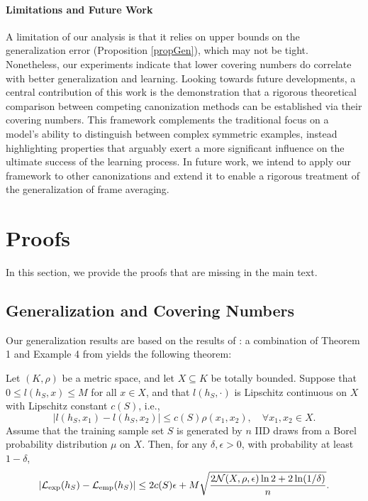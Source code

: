 \documentclass{article}
\begin{document}
\paragraph{Limitations and Future Work}
A limitation of our analysis is that it relies on upper bounds on the generalization error (Proposition \ref{propGen}), which may not be tight. Nonetheless, our experiments indicate that lower covering numbers do correlate with better generalization and learning. Looking towards future developments, a central contribution of this work is the demonstration that a rigorous theoretical comparison between competing canonization methods can be established via their covering numbers. This framework complements the traditional focus on a model's ability to distinguish between complex symmetric examples, instead highlighting properties that arguably exert a more significant influence on the ultimate success of the learning process. In future work, we intend to apply our framework to other canonizations and extend it to enable a rigorous treatment of the generalization of frame averaging. 

\newpage


\newpage
\appendix


\section{Proofs}
In this section, we provide the proofs that are missing in the main text. 


\subsection{Generalization and Covering Numbers}\label{app:gen}
Our generalization results are based on the results of \cite{xu_robustness_2012}: a combination of Theorem 1 and Example 4 from  \cite{xu_robustness_2012} yields the following theorem:  
\begin{theorem}\label{thm:xu}
Let $(K,\rho)$ be a metric space, and let $X\subseteq K$ be totally bounded. Suppose that
$0\le l(h_S,x)\le M$ for all $x\in X$, and that $l(h_S,\cdot)$ is Lipschitz continuous on $X$ with Lipschitz constant $c(S)$, i.e.,
\begin{equation*}
|l(h_S,x_1)-l(h_S,x_2)|
\le c(S)\rho(x_1,x_2),
\quad \forall x_1,x_2\in X.
\end{equation*}
Assume that the training sample set $S$ is generated by $n$ IID draws from a Borel probability distribution $\mu$ on $X$. Then, for any $\delta,\epsilon>0$, with probability at least $1-\delta$,
\begin{equation}\label{eq:intermediate}
|\mathcal{L}_{\mathrm{exp}}(h_S)-\mathcal{L}_{\mathrm{emp}}(h_S)|
\le
2c(S)\epsilon
+
M\sqrt{
\frac{
2\mathcal{N}(X,\rho,\epsilon)\ln 2
+
2\ln(1/\delta)
}{n}
}.
\end{equation}
\end{theorem}
\end{document}
